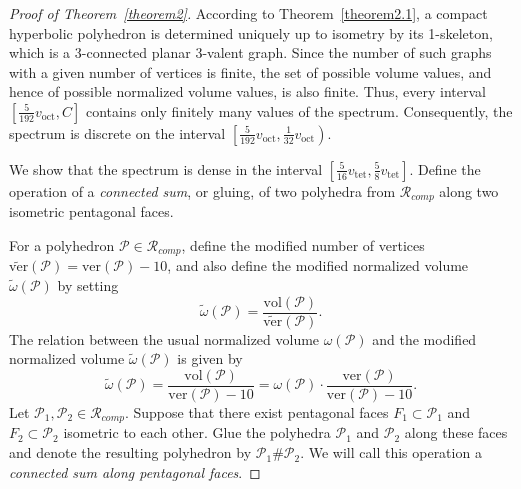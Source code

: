 \documentclass{amsart}
\newcommand{\vol}{\mathrm{vol}}
\newcommand{\tomega}{\widetilde{\omega}}
\newcommand{\tN}{\widetilde{\ver}}
\newcommand{\voct}{v_{\mathrm{oct}}}
\newcommand{\vtet}{v_{\mathrm{tet}}}
\newcommand{\ver}{\mathrm{ver}}
\begin{document}
\begin{proof}[Proof of Theorem~\ref{theorem2}]
	According to Theorem~\ref{theorem2.1}, a compact hyperbolic polyhedron is determined uniquely up to isometry by its 1-skeleton, which is a 3-connected planar 3-valent graph.
	Since the number of such graphs with a given number of vertices is finite, the set of possible volume values, and hence of possible normalized volume values, is also finite.
	Thus, every interval $\left[ \frac{5}{192} \voct, C \right]$ contains only finitely many values of the spectrum.
	Consequently, the spectrum is discrete on the interval $\left[ \frac{5}{192} \voct, \frac{1}{32} \voct \right)$.

	We show that the spectrum is dense in the interval $\left[\frac{5}{16} \vtet, \frac{5}{8} \vtet \right]$.
	Define the operation of a \textit{connected sum}, or gluing, of two polyhedra from $\mathcal{R}_{comp}$ along two isometric pentagonal faces.

	For a polyhedron $\mathcal P \in \mathcal R_{comp}$, define the modified number of vertices $\tN(\mathcal P) = \ver(\mathcal P) - 10$, and also define the modified normalized volume $\tomega(\mathcal P)$ by setting  
	$$
	\tomega(\mathcal P) = \frac{\vol(\mathcal P)}{\tN(\mathcal P)}.
	$$
	The relation between the usual normalized volume $\omega(\mathcal{P})$ and the modified normalized volume $\tomega(\mathcal{P})$ is given by
	$$ 
	\tomega(\mathcal P) = \frac{\vol(\mathcal P)}{\ver(\mathcal P) - 10} = \omega(\mathcal P) \cdot \frac{\ver(\mathcal P)}{\ver(\mathcal P) - 10}. 
	$$
	Let $\mathcal P_1, \mathcal P_2 \in \mathcal R_{comp}$. Suppose that there exist pentagonal faces $F_1 \subset \mathcal P_1$ and $F_2 \subset \mathcal P_2$ isometric to each other.
	Glue the polyhedra $\mathcal P_1$ and $\mathcal P_2$ along these faces and denote the resulting polyhedron by $\mathcal P_1 \# \mathcal P_2$.
		We will call this operation a \textit{connected sum along pentagonal faces}.
	

\end{proof}
\end{document}

